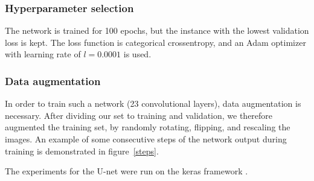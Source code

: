 \documentclass[10pt,conference,compsocconf]{IEEEtran}
\begin{document}
\subsubsection{Hyperparameter selection}		
 The network is trained for 100 epochs, but the instance with the lowest validation loss is kept. The loss function is categorical crossentropy, and an Adam optimizer with learning rate of $l=0.0001$ is used. 
 \subsubsection{Data augmentation}
 In order to train such a network (23 convolutional layers), data augmentation is necessary. After dividing our set to training and validation, we therefore augmented the training set, by randomly rotating, flipping, and rescaling the images. 
 An example of some consecutive steps of the network output during training is demonstrated in figure~\ref{steps}.
 
 The experiments for the U-net were run on the keras framework \cite{chollet2015keras}.
\end{document}
